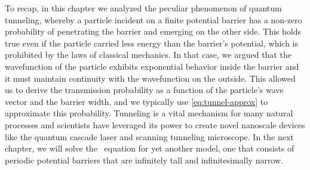 To recap, in this chapter we analyzed the peculiar phenomenon of quantum tunneling, whereby a particle incident on a finite potential barrier has a non-zero probability of penetrating the barrier and emerging on the other side. 
This holds true even if the particle carried less energy than the barrier's potential, which is prohibited by the laws of classical mechanics. 
In that case, we argued that the wavefunction of the particle exhibits exponential behavior inside the barrier and it must maintain continuity with the wavefunction on the outside. 
This allowed us to derive the transmission probability as a function of the particle's wave vector and the barrier width, and we typically use \autoref{eq:tunnel-approx} to approximate this probability. 
Tunneling is a vital mechanism for many natural processes and scientists have leveraged its power to create novel nanoscale devices like the quantum cascade laser and scanning tunneling microscope. 
In the next chapter, we will solve the \Sch\ equation for yet another model, one that consists of periodic potential barriers that are infinitely tall and infinitesimally narrow.

%